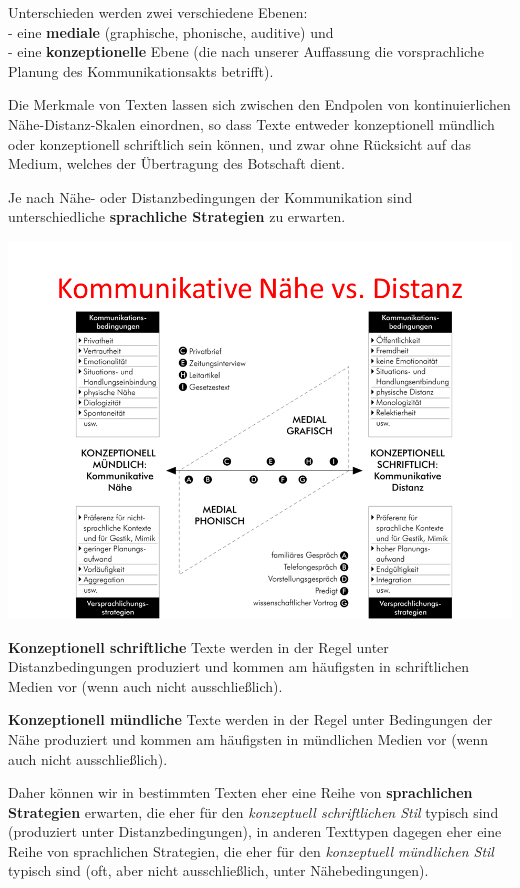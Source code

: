 \documentclass[
  letterpaper,
  DIV=11,
  numbers=noendperiod]{scrreprt}
\begin{document}
Unterschieden werden zwei verschiedene Ebenen:\\
- eine \textbf{mediale} (graphische, phonische, auditive) und\\
- eine \textbf{konzeptionelle} Ebene (die nach unserer Auffassung die
vorsprachliche Planung des Kommunikationsakts betrifft).

Die Merkmale von Texten lassen sich zwischen den Endpolen von
kontinuierlichen Nähe-Distanz-Skalen einordnen, so dass Texte entweder
konzeptionell mündlich oder konzeptionell schriftlich sein können, und
zwar ohne Rücksicht auf das Medium, welches der Übertragung des
Botschaft dient.

Je nach Nähe- oder Distanzbedingungen der Kommunikation sind
unterschiedliche \textbf{sprachliche Strategien} zu erwarten.

\includegraphics[width=1\textwidth,height=\textheight]{./pictures/nahe_distanz_diagram3.png}

\textbf{Konzeptionell schriftliche} Texte werden in der Regel unter
Distanzbedingungen produziert und kommen am häufigsten in schriftlichen
Medien vor (wenn auch nicht ausschließlich).

\textbf{Konzeptionell mündliche} Texte werden in der Regel unter
Bedingungen der Nähe produziert und kommen am häufigsten in mündlichen
Medien vor (wenn auch nicht ausschließlich).

Daher können wir in bestimmten Texten eher eine Reihe von
\textbf{sprachlichen Strategien} erwarten, die eher für den
\emph{konzeptuell schriftlichen Stil} typisch sind (produziert unter
Distanzbedingungen), in anderen Texttypen dagegen eher eine Reihe von
sprachlichen Strategien, die eher für den \emph{konzeptuell mündlichen
Stil} typisch sind (oft, aber nicht ausschließlich, unter
Nähebedingungen).
\end{document}

